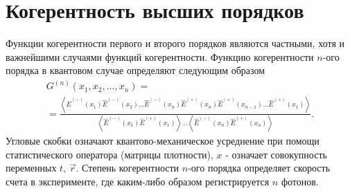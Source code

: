 \section{Когерентность высших порядков}
Функции когерентности первого и второго порядков являются частными,
хотя и важнейшими случаями функций когерентности. Функцию
когерентности $n$-ого порядка в квантовом случае определяют
следующим образом 
\begin{eqnarray}
G^{(n)}\left(x_1, x_2, \dots , x_n\right) =  
\nonumber \\
=
\frac{\left<
\hat{E}^{(-)}\left(x_1\right)
\hat{E}^{(-)}\left(x_2\right)
\dots
\hat{E}^{(-)}\left(x_n\right)
\hat{E}^{(+)}\left(x_{n}\right)
\hat{E}^{(+)}\left(x_{n - 1} \right)
\dots
\hat{E}^{(+)}\left(x_{1}\right)
\right>}
{
\left<
\hat{E}^{(-)}\left(x_1\right)
\hat{E}^{(+)}\left(x_1\right)
\right>
\dotsc
\left<
\hat{E}^{(-)}\left(x_{n}\right)
\hat{E}^{(+)}\left(x_{n}\right)
\right>
}.
\label{eqCh4_39}
\end{eqnarray}
Угловые скобки означают квантово-механическое усреднение при помощи
статистического оператора (матрицы плотности),  $x$ - означает
совокупность переменных $t$, $\vec{r}$. Степень когерентности $n$-ого
порядка определяет скорость счета в эксперименте, где каким-либо
образом регистрируется $n$ фотонов. 
